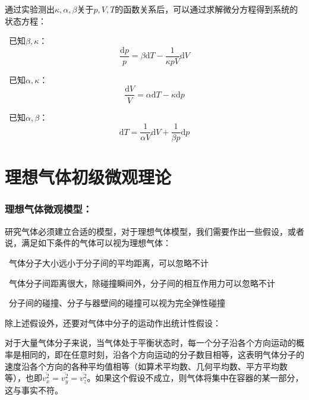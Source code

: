 \documentclass[zihao=5,UTF8]{report}
\begin{document}
通过实验测出$\kappa,\alpha,\beta$关于$p,V,T$的函数关系后，可以通过求解微分方程得到系统的状态方程：\par
{}\ 已知$\beta,\kappa$：
\begin{equation}
    \frac{\mathrm{d}p}{p} = \beta\mathrm{d}T - \frac{1}{\kappa pV}\mathrm{d}V
\end{equation}\par
{}\ 已知$\alpha,\kappa$：
\begin{equation}
    \frac{\mathrm{d}V}{V} = \alpha \mathrm{d}T - \kappa \mathrm{d}p
\end{equation}\par
{}\ 已知$\alpha,\beta$：
\begin{equation}
    \mathrm{d}T = \frac{1}{\alpha V}\mathrm{d}V + \frac{1}{\beta p}\mathrm{d}p
\end{equation}

\section{理想气体初级微观理论}

\subsubsection{理想气体微观模型：}
研究气体必须建立合适的模型，对于理想气体模型，我们需要作出一些假设，或者说，满足如下条件的气体可以视为理想气体：\par
{}\ 气体分子大小远小于分子间的平均距离，可以忽略不计\par
{}\ 气体分子间距离很大，除碰撞瞬间外，分子间的相互作用力可以忽略不计\par
{}\ 分子间的碰撞、分子与器壁间的碰撞可以视为完全弹性碰撞\par
除上述假设外，还要对气体中分子的运动作出统计性假设：\par
对于大量气体分子来说，当气体处于平衡状态时，每一个分子沿各个方向运动的概率是相同的，即在任意时刻，沿各个方向运动的分子数目相等，这表明气体分子的速度沿各个方向的各种平均值相等（如算术平均数、几何平均数、平方平均数等），也即$\overline{v^2_x}=\overline{v^2_y}=\overline{v^2_z}$。如果这个假设不成立，则气体将集中在容器的某一部分，这与事实不符。
\end{document}
